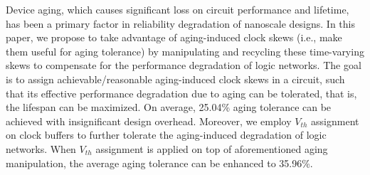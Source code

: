 Device aging, which causes significant loss on circuit performance and lifetime, has been a primary factor in reliability degradation of nanoscale designs. In this paper, we propose to take advantage of aging-induced clock skews (i.e., make them useful for aging tolerance) by manipulating and recycling these time-varying skews to compensate for the performance degradation of logic networks. The goal is to assign achievable/reasonable aging-induced clock skews in a circuit, such that its effective performance degradation due to aging can be tolerated, that is, the lifespan can be maximized.  On average, 25.04\% aging tolerance can be achieved with insignificant design overhead. Moreover, we employ $V_{th}$ assignment on clock buffers to further tolerate the aging-induced degradation of logic networks. When $V_{th}$ assignment is applied on top of aforementioned aging manipulation, the average aging tolerance can be enhanced to 35.96\%.
